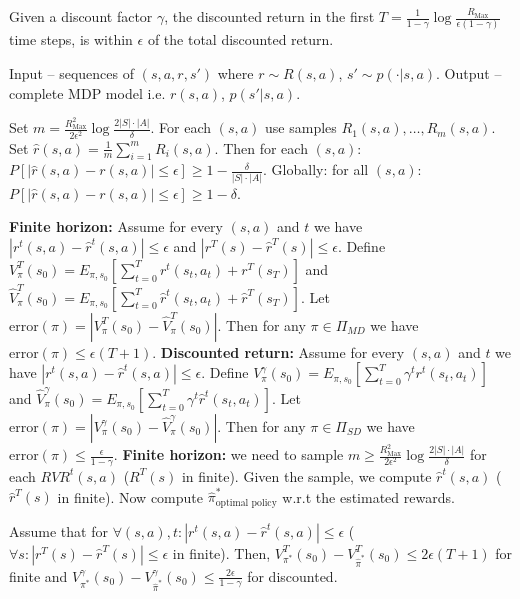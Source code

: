 

\begin{thm}
Given a discount factor $\gamma$, the discounted return in the first $T = \frac{1}{1-\gamma} \log\frac{R_{\text{Max}}}{\epsilon(1-\gamma)}$ time steps, is within $\epsilon$ of the total discounted return.
\end{thm}

\noindent{} Input – sequences of $(s, a, r, s')$ where $r \sim R(s, a)$, $s' \sim p(\cdot |s, a)$. Output – complete MDP model i.e. $r(s, a)$, $p(s' |s, a)$.
\begin{clm}
Set $m = \frac{R_{\text{Max}}^2}{2\epsilon^2} \log\frac{2|S|\cdot|A|}{\delta}$. For each $(s, a)$ use samples $R_1(s, a), \dots, R_m(s, a)$. Set $\hat{r}(s, a) = \frac{1}{m}\sum_{i=1}^{m}R_i(s, a)$. Then for each $(s, a)$: $P[|\hat{r}(s, a) - r(s, a)| \leq \epsilon] \geq 1 - \frac{\delta}{|S|\cdot|A|}$. Globally: for all $(s, a)$: $P[|\hat{r}(s, a) - r(s, a)| \leq \epsilon] \geq 1 - \delta$.
\end{clm}
\textbf{Finite horizon: }Assume for every $(s, a)$ and $t$ we have $|r^t(s, a) - \hat{r}^t(s, a)| \leq \epsilon$ and $|r^T(s) - \hat{r}^T(s)| \leq \epsilon$. Define $V^T_{\pi}(s_0) = E_{\pi,s_0}\left[\sum_{t=0}^{T} r^t(s_t, a_t) + r^T(s_T)\right]$ and $\hat{V}^T_{\pi}(s_0) = E_{\pi,s_0}\left[\sum_{t=0}^{T} \hat{r}^t(s_t, a_t) + \hat{r}^T(s_T)\right]$. Let $\text{error}(\pi) = |V^T_{\pi}(s_0) - \hat{V}^T_{\pi}(s_0)|$. Then for any $\pi \in \Pi_{MD}$ we have $\text{error}(\pi) \leq \epsilon(T + 1)$.
\noindent{} \textbf{Discounted return:} Assume for every $(s, a)$ and $t$ we have $|r^t(s, a) - \hat{r}^t(s, a)| \leq \epsilon$. Define $V^{\gamma}_{\pi}(s_0) = E_{\pi,s_0}\left[\sum_{t=0}^{T} \gamma^t r^t(s_t, a_t)\right]$ and $\hat{V}^{\gamma}_{\pi}(s_0) = E_{\pi,s_0}\left[\sum_{t=0}^{T} \gamma^t \hat{r}^t(s_t, a_t)\right]$. Let $\text{error}(\pi) = |V^{\gamma}_{\pi}(s_0) - \hat{V}^{\gamma}_{\pi}(s_0)|$. Then for any $\pi \in \Pi_{SD}$ we have $\text{error}(\pi) \leq \frac{\epsilon}{1-\gamma}$.
\noindent{}
\textbf{ Finite horizon:} we need to sample $m \geq \frac{R_{\text{Max}}^2}{2\epsilon^2} \log\frac{2|S|\cdot|A|}{\delta}$ for each $RV R^t(s, a)$ ($R^T(s)$ in finite). Given the sample, we compute $\hat{r}^t(s, a)$ ( $\hat{r}^T(s)$ in finite). Now compute $\hat{\pi}^*_{\text{optimal policy}}$ w.r.t the estimated rewards.
\begin{thm}
Assume that for $\forall(s, a),t:|r^t(s, a) - \hat{r}^t(s, a)| \leq \epsilon$ ($\forall s: |r^T(s) - \hat{r}^T(s)| \leq \epsilon$ in finite). Then, $V^T_{\pi^*}(s_0) - V^T_{\hat{\pi}^*}(s_0) \leq 2\epsilon(T + 1)$ for finite and $V^{\gamma}_{\pi^*}(s_0) - V^{\gamma}_{\hat{\pi}^*}(s_0) \leq \frac{2\epsilon}{1-\gamma}$ for discounted.
\end{thm}
